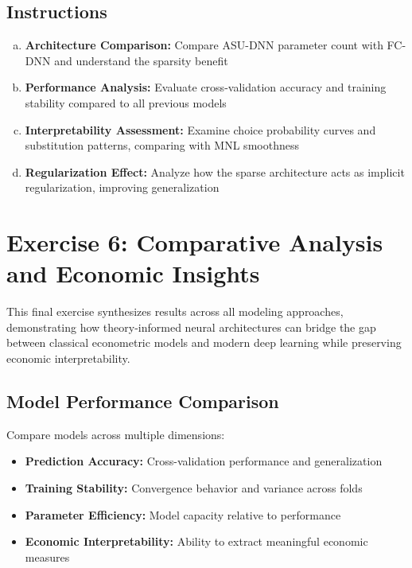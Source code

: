 \documentclass[11pt]{article}
\begin{document}
\subsection*{Instructions}

\begin{enumerate}[(a)]
\item \textbf{Architecture Comparison:} Compare ASU-DNN parameter count with FC-DNN and understand the sparsity benefit
\item \textbf{Performance Analysis:} Evaluate cross-validation accuracy and training stability compared to all previous models
\item \textbf{Interpretability Assessment:} Examine choice probability curves and substitution patterns, comparing with MNL smoothness
\item \textbf{Regularization Effect:} Analyze how the sparse architecture acts as implicit regularization, improving generalization
\end{enumerate}

\section*{Exercise 6: Comparative Analysis and Economic Insights}

\begin{center}
\end{center}

This final exercise synthesizes results across all modeling approaches, demonstrating how theory-informed neural architectures can bridge the gap between classical econometric models and modern deep learning while preserving economic interpretability.

\subsection*{Model Performance Comparison}

Compare models across multiple dimensions:
\begin{itemize}
\item \textbf{Prediction Accuracy:} Cross-validation performance and generalization
\item \textbf{Training Stability:} Convergence behavior and variance across folds
\item \textbf{Parameter Efficiency:} Model capacity relative to performance
\item \textbf{Economic Interpretability:} Ability to extract meaningful economic measures
\end{itemize}
\end{document}
